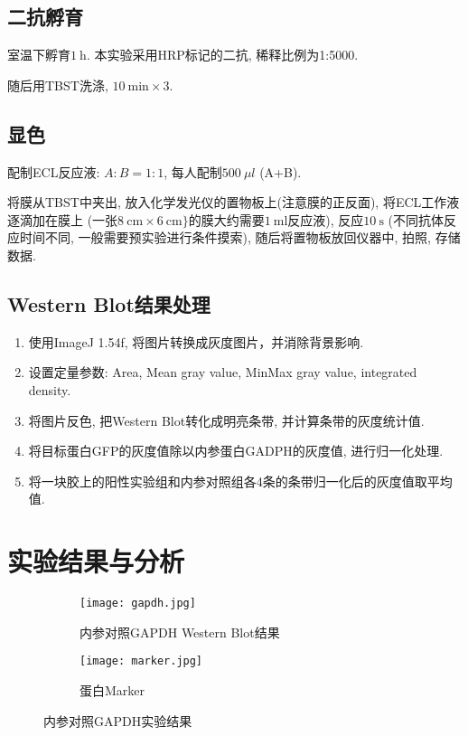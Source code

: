 \documentclass{article}
\begin{document}
\subsection{二抗孵育}

室温下孵育$1\ \mbox{h}$. 本实验采用HRP标记的二抗, 稀释比例为1:5000.

随后用TBST洗涤, $10\ \mbox{min} \times 3$. 

\subsection{显色}

配制ECL反应液: $A:B=1:1$, 每人配制$500\ \mu l$ (A+B).

将膜从TBST中夹出,
放入化学发光仪的置物板上(注意膜的正反面), 将ECL工作液逐滴加在膜上 (一张$8\ \mbox{cm} \times 6\ \mbox{cm\}}$的膜大约需要$1\ \mbox{ml}$反应液), 反应$10\ \mbox{s}$ (不同抗体反应时间不同, 一般需要预实验进行条件摸索), 随后将置物板放回仪器中, 拍照, 存储数据. 

\subsection{Western Blot结果处理}

\begin{enumerate}
	\item 使用ImageJ 1.54f, 将图片转换成灰度图片，并消除背景影响.
	\item 设置定量参数: Area, Mean gray  value, MinMax gray value, integrated density.
	\item 将图片反色, 把Western Blot转化成明亮条带, 并计算条带的灰度统计值.
	\item 将目标蛋白GFP的灰度值除以内参蛋白GADPH的灰度值, 进行归一化处理.
	\item 将一块胶上的阳性实验组和内参对照组各4条的条带归一化后的灰度值取平均值.
\end{enumerate}


\section{实验结果与分析}

\begin{figure}[htbp]
    \centering
    \begin{subfigure}[c]{0.77\textwidth}
        \texttt{[image: gapdh.jpg]}
        \caption{内参对照GAPDH Western Blot结果}
        \label{fig:sub1}
    \end{subfigure}
    \begin{subfigure}[c]{0.22\textwidth}
        \texttt{[image: marker.jpg]}
        \caption{蛋白Marker}
        \label{fig:sub2}
    \end{subfigure}
    \caption{内参对照GAPDH实验结果}
    \label{fig:group1}
\end{figure}
\end{document}
